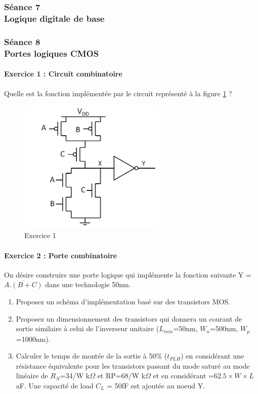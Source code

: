\documentclass[paper=a4, fontsize=11pt]{article} %
\numberwithin{equation}{section} %
\numberwithin{figure}{section} %
\numberwithin{table}{section} %
\begin{document}
\newpage
\part{}
\setcounter{figure}{0}
\setcounter{section}{7}

\section{Séance 7\\ Logique digitale de base}



\newpage
\setcounter{figure}{0}
\setcounter{section}{8}
\section{Séance 8\\ Portes logiques CMOS}
\subsection*{Exercice 1 : Circuit combinatoire}
Quelle est la fonction implémentée par le circuit représenté à la figure \ref{fig8-1} ?
\begin{figure}[!htbp]
   \centering
   \includegraphics[width=7cm]{figure/fig8-1.png}
   \caption{Exercice 1}
   \label{fig8-1}
\end{figure}

\subsection*{Exercice 2 : Porte combinatoire}

On désire construire une porte logique qui implémente la fonction suivante Y = $\overline{A.(B+C)}$ dans une technologie 50nm.
\begin{enumerate}
	\item Proposez un schéma d'implémentation basé sur des transistors MOS.
	\item Proposez un dimensionnement des transistors qui donnera un courant de sortie similaire à celui de l'inverseur unitaire ($L_{min}$=50nm, $W_{n}$=500nm, $W_{p}$=1000nm).
\item Calculer le temps de montée de la sortie à 50\% ($t_{PLH}$) en considérant une résistance équivalente pour les transistors passant du mode saturé au mode linéaire de $R_N$=34/W k$\Omega$ et RP=68/W k$\Omega$ et en considérant \cox=$62.5\times W \times L$ aF. Une capacité de load $C_L$ = 50fF est ajoutée au noeud Y.
\end{enumerate}
\end{document}
